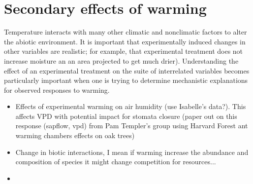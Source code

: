 \documentclass{article}
\begin{document}
\section {Secondary effects of warming}
Temperature interacts with many other climatic and nonclimatic factors to alter the abiotic environment. It is important that experimentally induced changes in other variables are realistic; for example, that experimental treatment does not increase moisture an an area projected to get much drier). Understanding the effect of an experimental treatment on the suite of interrelated variables becomes particularly  important when one is trying to determine mechanistic explanations for observed responses to warming.
\begin{itemize}
\item Effects of experimental warming on air humidity (use Isabelle's data?). This affects VPD with potential impact for stomata closure (paper out on this response (sapflow, vpd) from Pam Templer's group using Harvard Forest ant warming chambers effects on oak trees)
\item Change in biotic interactions, I mean if warming increase the abundance and composition of species it might change competition for resources...
\item 
\end{itemize}
\end{document}
